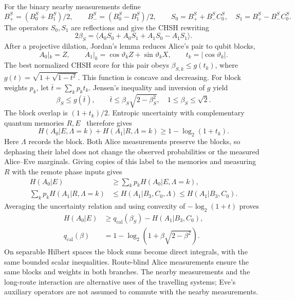\documentclass[aps,10pt,onecolumn,prx,superscriptaddress,longbibliography,nofootinbib]{revtex4-2}
\begin{document}
For the binary nearby measurements define
\begin{equation}
 B_+^S=(B_0^S+B_1^S)/2,\qquad B_-^S=(B_0^S-B_1^S)/2,
 \qquad S_0=B_+^S+B_-^SC_0^S,\quad S_1=B_+^S-B_-^SC_0^S.
\end{equation}
The operators \(S_0,S_1\) are reflections and give the CHSH rewriting
\begin{equation}
 2\beta_S=\langle A_0S_0+A_0S_1+A_1S_0-A_1S_1\rangle.
 \label{eq:si-chsh-rewrite}
\end{equation}
After a projective dilation, Jordan's lemma reduces Alice's pair to qubit blocks,
\begin{equation}
 A_0|_k=Z,\qquad A_1|_k=\cos\vartheta_k Z+\sin\vartheta_k X,
 \qquad t_k=|\cos\vartheta_k|.
\end{equation}
The best normalized CHSH score for this pair obeys \(\beta_{S,k}\leq g(t_k)\), where \(g(t)=\sqrt{1+\sqrt{1-t^2}}\). This function is concave and decreasing. For block weights \(p_k\), let \(\bar t=\sum_kp_kt_k\). Jensen's inequality and inversion of \(g\) yield
\begin{equation}
 \beta_S\leq g(\bar t),\qquad
 \bar t\leq\beta_S\sqrt{2-\beta_S^2},\quad 1\leq\beta_S\leq\sqrt2.
 \label{eq:si-overlap-from-score}
\end{equation}
The block overlap is \((1+t_k)/2\). Entropic uncertainty with complementary quantum memories \(R,E\)~\cite{Berta2010,Lim2013,TanWolf2024} therefore gives
\begin{equation}
 H(A_0|E,\Lambda=k)+H(A_1|R,\Lambda=k)\geq1-\log_2(1+t_k).
\end{equation}
Here \(\Lambda\) records the block. Both Alice measurements preserve the blocks, so dephasing their label does not change the observed probabilities or the measured Alice--Eve marginals. Giving copies of this label to the memories and measuring \(R\) with the remote phase inputs gives
\begin{align}
 H(A_0|E)&\geq\sum_kp_kH(A_0|E,\Lambda=k),\nonumber\\
 \sum_kp_kH(A_1|R,\Lambda=k)&\leq H(A_1|B_3,C_0,\Lambda)
 \leq H(A_1|B_3,C_0).
\end{align}
Averaging the uncertainty relation and using convexity of \(-\log_2(1+t)\) proves
\begin{align}
 H(A_0|E)&\geq q_{\mathrm{cal}}(\beta_S)-H(A_1|B_3,C_0),
 \label{eq:si-entropy-calibration}\\
 q_{\mathrm{cal}}(\beta)&=1-\log_2\!\left(1+\beta\sqrt{2-\beta^2}\right).
\end{align}
On separable Hilbert spaces the block sums become direct integrals, with the same bounded scalar inequalities. Route-blind Alice measurements ensure the same blocks and weights in both branches. The nearby measurements and the long-route interaction are alternative uses of the travelling systems; Eve's auxiliary operators are not assumed to commute with the nearby measurements.
\end{document}
